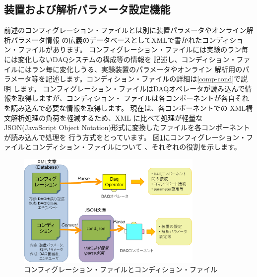 \documentclass[a4j,10pt,dvips,onecolumn,oneside,final]{jarticle}%
\begin{document}
\subsection{装置および解析パラメータ設定機能}\label{cond}
前述のコンフィグレーション・ファイルとは別に装置パラメータやオンライン解析パラメータ情報
の広義のデータベースとしてXMLで書かれたコンディション・ファイルがあります。
コンフィグレーション・ファイルには実験のラン毎には変化しないDAQシステムの構成等の情報を
記述し、コンディション・ファイルにはラン毎に変化しうる、実験装置のパラメータやオンライン
解析用のパラメータ等を記述します。コンディション・ファイルの詳細は\ref{comp-cond}で説明
します。
コンフィグレーション・ファイルはDAQオペレータが読み込んで情報を取得しますが、コンディション・
ファイルは各コンポーネントが各自それを読み込んで必要な情報を取得します。
現在は、各コンポーネントでの XML構文解析処理の負荷を軽減するため、XML に比べて処理が軽量な 
JSON(JavaScript Object Notation)形式に変換したファイルを各コンポーネントが読み込んで処理を
行う方式をとっています。
図\ref{condition.fig}にコンフィグレーション・ファイルとコンディション・ファイルについて
、それぞれの役割を示します。
\begin{figure}[htbp]
 \begin{center}
  \includegraphics[width=90mm]{condition.eps}
  \caption{コンフィグレーション・ファイルとコンディション・ファイル}
  \label{condition.fig}
 \end{center}
\end{figure}
\end{document}
